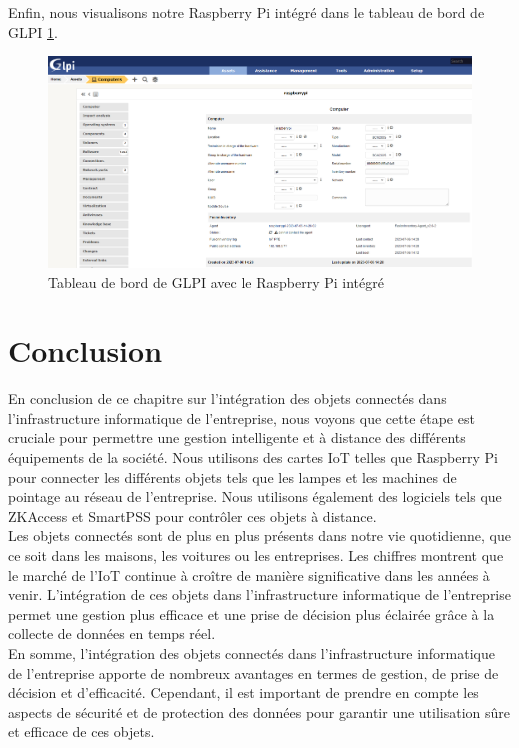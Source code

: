 Enfin, nous visualisons notre Raspberry Pi intégré dans le tableau de bord de GLPI \ref{fig:glpi-raspberry}.

\begin{figure}[H]
\centering
\includegraphics[width=16.5cm]{Images/RASPBERRYPIGLPI.png}
\caption{Tableau de bord de GLPI avec le Raspberry Pi intégré}
\label{fig:glpi-raspberry}
\end{figure}

\section{Conclusion}

En conclusion de ce chapitre sur l'intégration des objets connectés dans l'infrastructure informatique de l'entreprise, nous voyons que cette étape est cruciale pour permettre une gestion intelligente et à distance des différents équipements de la société. Nous utilisons des cartes IoT telles que Raspberry Pi pour connecter les différents objets tels que les lampes et les machines de pointage au réseau de l'entreprise. Nous utilisons également des logiciels tels que ZKAccess et SmartPSS pour contrôler ces objets à distance. \\

Les objets connectés sont de plus en plus présents dans notre vie quotidienne, que ce soit dans les maisons, les voitures ou les entreprises. Les chiffres montrent que le marché de l'IoT continue à croître de manière significative dans les années à venir. L'intégration de ces objets dans l'infrastructure informatique de l'entreprise permet une gestion plus efficace et une prise de décision plus éclairée grâce à la collecte de données en temps réel. \\

En somme, l'intégration des objets connectés dans l'infrastructure informatique de l'entreprise apporte de nombreux avantages en termes de gestion, de prise de décision et d'efficacité. Cependant, il est important de prendre en compte les aspects de sécurité et de protection des données pour garantir une utilisation sûre et efficace de ces objets. \\



